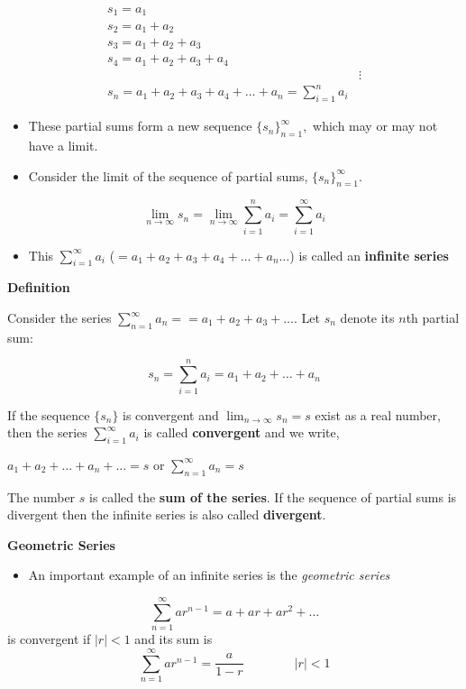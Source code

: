 \documentclass[]{book}
\providecommand{\tightlist}{%
  \setlength{\itemsep}{0pt}\setlength{\parskip}{0pt}}
\begin{document}
\begin{align*}
   s_1=a_1 \\
   s_2=a_1+a_2 \\
   s_3=a_1+a_2+a_3 \\
   s_4=a_1+a_2+a_3+a_4 \\
   &\vdots\\
   s_n=a_1+a_2+a_3+a_4+\dots +a_n =\sum_{i=1}^na_i
\end{align*}

\begin{itemize}
\item
  These partial sums form a new sequence \(\{s_n\}_{n=1}^\infty,\) which may or may not have a limit.
\item
  Consider the limit of the sequence of partial sums, \(\{s_n\}_{n=1}^\infty.\)
\end{itemize}

\[\lim_{n\to\infty}s_n= \lim_{n\to\infty}\sum_{i=1}^na_i=\sum_{i=1}^\infty a_i\]

\begin{itemize}
\tightlist
\item
  This \(\sum_{i=1}^\infty a_i\) (\(=a_1+a_2+a_3+a_4+\dots +a_n \dots\)) is called an \textbf{infinite series}
\end{itemize}

\newpage

\textbf{Definition}

Consider the series \(\sum_{n=1}^\infty a_n= =a_1+a_2+a_3+\dots.\) Let \(s_n\) denote its \(n\)th partial sum:

\[s_n= \sum_{i=1}^n a_i= a_1+a_2+\dots +a_n\]

If the sequence \(\{s_n\}\) is convergent and \(\lim_{n\to \infty}s_n=s\) exist as a real number, then the series \(\sum_{i=1}^\infty a_i\) is called \textbf{convergent} and we write,

\(a_1+a_2+\dots +a_n+\dots=s\) or \(\sum_{n=1}^\infty a_n=s\)

The number \(s\) is called the \textbf{sum of the series}.
If the sequence of partial sums is divergent then the infinite series is also
called \textbf{divergent}.

\textbf{Geometric Series}

\begin{itemize}
\tightlist
\item
  An important example of an infinite series is the \emph{geometric series}
\end{itemize}

\[\sum_{n=1}^\infty ar^{n-1}=a+ar+ar^2+\dots\]
is convergent if \(|r|<1\) and its sum is
\[\sum_{n=1}^\infty ar^{n-1}= \frac{a}{1-r}\qquad\qquad|r|<1\]
\end{document}
